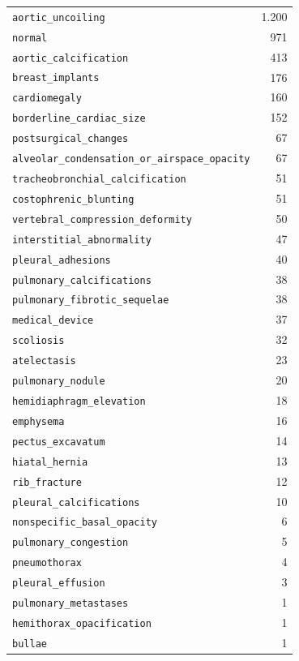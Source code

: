 \documentclass[../main.tex]{subfiles}
\begin{document}
\begin{longtable}{lr}
\texttt{aortic\_uncoiling} & 1.200 \\
\texttt{normal} & 971 \\
\texttt{aortic\_calcification} & 413 \\
\texttt{breast\_implants} & 176 \\
\texttt{cardiomegaly} & 160 \\
\texttt{borderline\_cardiac\_size} & 152 \\
\texttt{postsurgical\_changes} & 67 \\
\texttt{alveolar\_condensation\_or\_airspace\_opacity} & 67 \\
\texttt{tracheobronchial\_calcification} & 51 \\
\texttt{costophrenic\_blunting} & 51 \\
\texttt{vertebral\_compression\_deformity} & 50 \\
\texttt{interstitial\_abnormality} & 47 \\
\texttt{pleural\_adhesions} & 40 \\
\texttt{pulmonary\_calcifications} & 38 \\
\texttt{pulmonary\_fibrotic\_sequelae} & 38 \\
\texttt{medical\_device} & 37 \\
\texttt{scoliosis} & 32 \\
\texttt{atelectasis} & 23 \\
\texttt{pulmonary\_nodule} & 20 \\
\texttt{hemidiaphragm\_elevation} & 18 \\
\texttt{emphysema} & 16 \\
\texttt{pectus\_excavatum} & 14 \\
\texttt{hiatal\_hernia} & 13 \\
\texttt{rib\_fracture} & 12 \\
\texttt{pleural\_calcifications} & 10 \\
\texttt{nonspecific\_basal\_opacity} & 6 \\
\texttt{pulmonary\_congestion} & 5 \\
\texttt{pneumothorax} & 4 \\
\texttt{pleural\_effusion} & 3 \\
\texttt{pulmonary\_metastases} & 1 \\
\texttt{hemithorax\_opacification} & 1 \\
\texttt{bullae} & 1 \\
\end{longtable}
\end{document}
